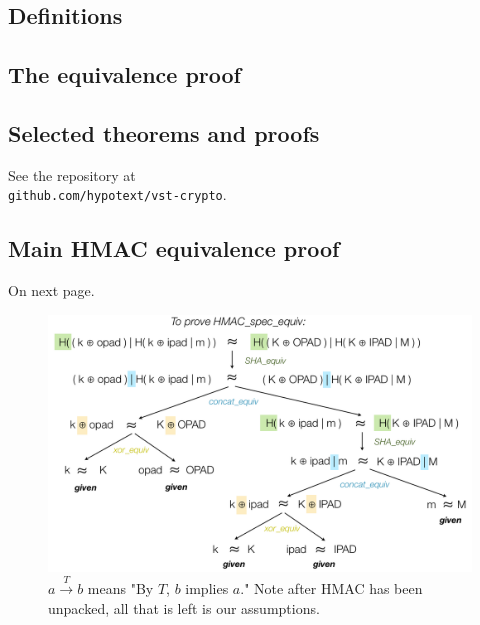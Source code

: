 \documentclass[twocolumn,showpacs,%
  nofootinbib,aps,superscriptaddress,%
  eqsecnum,prd,notitlepage,showkeys,10pt]{revtex4-1}
\begin{document}


\subsection{Definitions}







\subsection{The equivalence proof}



\subsection{Selected theorems and proofs}

See the repository at \\ \verb|github.com/hypotext/vst-crypto|.

\subsection{Main HMAC equivalence proof}
On next page. \\

 \begin{figure}[h!]
 	\centering
 	\includegraphics[scale=0.3]{HMAC_spec_equiv}
 	\caption{$a \xrightarrow{T} b$ means "By $T$, $b$ implies $a$." Note after HMAC has been unpacked, all that is left is our assumptions.}
 \end{figure}
\end{document}
